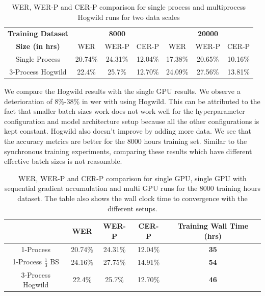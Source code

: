 \begin{table}[ht]
\centering
\begin{tabular}{c | c c c | c c c }
\hline
\textbf{Training Dataset} & \multicolumn{3}{c|}{\textbf{8000}} & \multicolumn{3}{c}{\textbf{20000}}\\\cline{2-7}
   \textbf{Size (in hrs)} & WER & WER-P & CER-P & WER & WER-P & CER-P\\
 \hline
  Single Process & 20.74\% & 24.31\% & 12.04\% & 17.38\% & 20.65\% & 10.16\%\\
  3-Process Hogwild & 22.4\% & 25.7\% & 12.70\% & 24.09\% & 27.56\% & 13.81\% \\
 \hline
\end{tabular}
\caption{\label{table:wer_hog} WER, WER-P and CER-P comparison for single process and multiprocess Hogwild runs for two data scales}
\end{table}

We compare the Hogwild results with the single GPU results. We observe a deterioration of 8\%-38\% in \acrshort{wer} with using Hogwild. This can be attributed to the fact that smaller batch sizes work does not work well for the hyperparameter configuration and model architecture setup because all the other configurations is kept constant. Hogwild also doesn't improve by adding more data. We see that the accuracy metrics are better for the 8000 hours training set. Similar to the synchronous training experiments, comparing these results which have different effective batch sizes is not reasonable. 

\begin{table}[ht]
\centering
\begin{tabular}{c | c c c | c }
\hline
     & WER & WER-P & CER-P & Training Wall Time (hrs)\\
 \hline
  1-Process & 20.74\% & 24.31\% & 12.04\% & \textbf{35} \\
  1-Process $\frac{1}{3}$ BS & 24.16\% & 27.75\% & 14.91\% & \textbf{54} \\
  3-Process Hogwild & 22.4\% & 25.7\% & 12.70\% & \textbf{46} \\
 \hline
\end{tabular}
\caption{\label{table:wer_hog_seq} WER, WER-P and CER-P comparison for single GPU, single GPU with sequential gradient accumulation and multi GPU runs for the 8000 training hours dataset. The table also shows the wall clock time to convergence with the different setups.}
\end{table}

